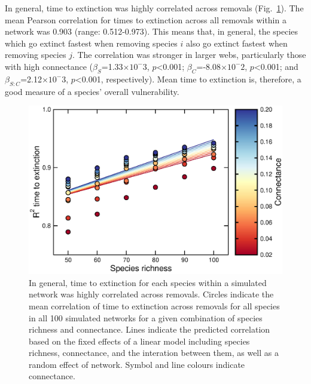 \documentclass[12pt]{article}
\begin{document}
		In general, time to extinction was highly correlated across removals (Fig.~\ref{extorder_corrs}). %
		The mean Pearson correlation for times to extinction across all removals within a network was 0.903 (range: 0.512-0.973). %
		This means that, in general, the species which go extinct fastest when removing species $i$ also go extinct fastest when removing species $j$.
		The correlation was stronger in larger webs, particularly those with high connectance ($\beta_{S}$=1.33$\times10^-3$, $p$\textless0.001; $\beta_{C}$=-8.08$\times10^-2$, $p$\textless0.001; and $\beta_{S:C}$=2.12$\times10^-3$, $p$\textless0.001, respectively). 
		Mean time to extinction is, therefore, a good measure of a species' overall vulnerability.



		\begin{figure}[h!]
			\caption{In general, time to extinction for each species within a simulated network was highly correlated across removals. Circles indicate the mean correlation of time to extinction across removals for all species in all 100 simulated networks for a given combination of species richness and connectance. Lines indicate the predicted correlation based on the fixed effects of a linear model including species richness, connectance, and the interation between them, as well as a random effect of network. Symbol and line colours indicate connectance.}
			\label{extorder_corrs}
			\includegraphics[width=\textwidth]{figures/extinction_order/extorder_correlations_paper_full.eps}
			\end{figure}
\end{document}
